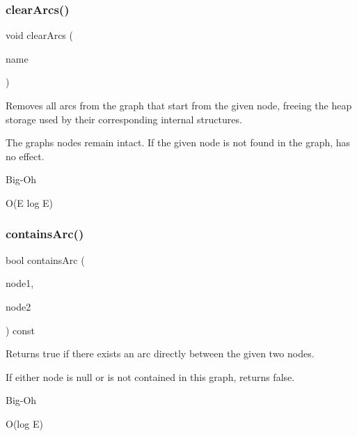 \subsubsection{\texorpdfstring{clear\+Arcs()}{clearArcs()}\hspace{0.1cm}{\footnotesize\ttfamily [3/3]}}
{\footnotesize\ttfamily void clear\+Arcs (\begin{DoxyParamCaption}\item[{const std\+::string \&}]{name }\end{DoxyParamCaption})}



Removes all arcs from the graph that start from the given node, freeing the heap storage used by their corresponding internal structures. 

The graph\textquotesingle{}s nodes remain intact. If the given node is not found in the graph, has no effect. \begin{DoxyRefDesc}{Big-\/\+Oh}
\item[\mbox{\hyperlink{BigOh__BigOh000052}{Big-\/\+Oh}}]O(\+E log E) \end{DoxyRefDesc}
\mbox{\label{classGraph_a9ca50139471975b82fdc6b1977bcfa4a}} 
\subsubsection{\texorpdfstring{contains\+Arc()}{containsArc()}\hspace{0.1cm}{\footnotesize\ttfamily [1/3]}}
{\footnotesize\ttfamily bool contains\+Arc (\begin{DoxyParamCaption}\item[{Node\+Type $\ast$}]{node1,  }\item[{Node\+Type $\ast$}]{node2 }\end{DoxyParamCaption}) const}



Returns true if there exists an arc directly between the given two nodes. 

If either node is null or is not contained in this graph, returns false. \begin{DoxyRefDesc}{Big-\/\+Oh}
\item[\mbox{\hyperlink{BigOh__BigOh000053}{Big-\/\+Oh}}]O(log E) \end{DoxyRefDesc}
\mbox{\label{classGraph_a515e45aae316b581bf1cf168541f4f44}} 
